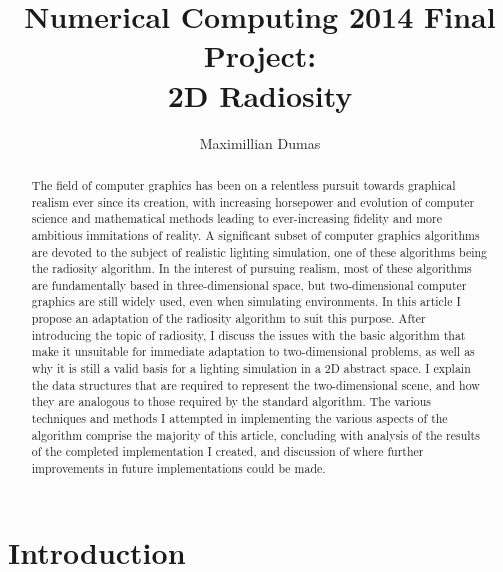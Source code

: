 \documentclass[letter]{article}
\begin{document}
\title{Numerical Computing 2014 Final Project:\\
2D Radiosity}
\author{Maximillian Dumas}
\maketitle

\begin{abstract}
The field of computer graphics has been on a relentless pursuit towards graphical realism ever since its creation, with increasing horsepower and evolution of computer science and mathematical methods leading to ever-increasing fidelity and more ambitious immitations of reality. A significant subset of computer graphics algorithms are devoted to the subject of realistic lighting simulation, one of these algorithms being the radiosity algorithm. In the interest of pursuing realism, most of these algorithms are fundamentally based in three-dimensional space, but two-dimensional computer graphics are still widely used, even when simulating environments. In this article I propose an adaptation of the radiosity algorithm to suit this purpose. After introducing the topic of radiosity, I discuss the issues with the basic algorithm that make it unsuitable for immediate adaptation to two-dimensional problems, as well as why it is still a valid basis for a lighting simulation in a 2D abstract space. I explain the data structures that are required to represent the two-dimensional scene, and how they are analogous to those required by the standard algorithm. The various techniques and methods I attempted in implementing the various aspects of the algorithm comprise the majority of this article, concluding with analysis of the results of the completed implementation I created, and discussion of where further improvements in future implementations could be made.
\end{abstract}
\section{Introduction}
\end{document}
